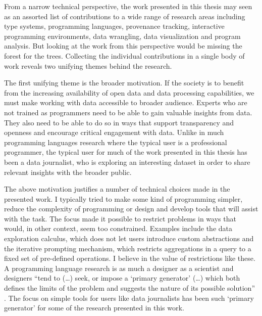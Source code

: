\documentclass[fleqn,11pt]{report}
\theoremstyle{definition}
\begin{document}
From a narrow technical perspective, the work presented in this thesis may seen as
an assorted list of contributions to a wide range of research areas including type systems,
programming languages, provenance tracking, interactive programming environments, data wrangling,
data visualization and program analysis. But looking at the work from this perspective would be
missing the forest for the trees. Collecting the individual contributions in
a single body of work reveals two unifying themes behind the research.

The first unifying theme is the broader motivation. If the society is to benefit from the
increasing availability of open data and data processing capabilities, we must make working
with data accessible to broader audience. Experts who are not trained as programmers need to
be able to gain valuable insights from data. They also need to be able to do so in ways that
support transparency and openness and encourage critical engagement with data.
Unlike in much programming languages research where the typical user is a professional
programmer, the typical user for much of the work presented in this thesis has been a data
journalist, who is exploring an interesting dataset in order to share relevant insights
with the broader public.

The above motivation justifies a number of technical choices made in the presented work.
I typically tried to make some kind of programming simpler, reduce the complexity of
programming or design and develop tools that will assist with the task. The focus made
it possible to restrict problems in ways that would, in other context, seem too constrained.
Examples include the data exploration calculus, which does not let users introduce custom
abstractions and the iterative prompting mechanism, which restricts aggregations in a query
to a fixed set of pre-defined operations. I believe in the value of restrictions
like these. A programming language research is as much a designer as a scientist and
designers ``tend to (\ldots) seek, or impose a `primary generator' (\dots) which both
defines the limits of the problem and suggests the nature of its possible solution''
\citep{cross-2007-designerly}. The focus on simple tools for users like data journalists
has been such `primary generator' for some of the research presented in this work.
\end{document}

